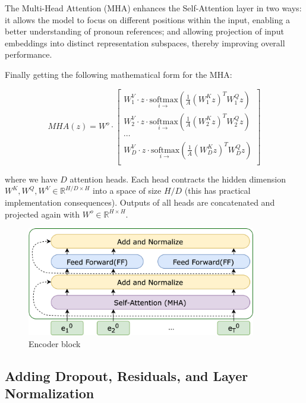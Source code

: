 The Multi-Head Attention ($\mathrm{MHA}$) enhances the Self-Attention layer in two ways: it allows the model to focus on different positions within the input, enabling a better understanding of pronoun references; and allowing projection of input embeddings into distinct representation subspaces, thereby improving overall performance.

\noindent Finally getting the following mathematical form for the $\mathrm{MHA}$:


\begin{equation}
MHA(z) =  W^o \cdot
\begin{bmatrix}
    W^V_1 \cdot z \cdot \underset{i \rightarrow}{\mathrm{softmax}}\left( \frac{1}{A} \left(W^K_1 z\right)^T W^Q_1 z \right)\\
    W^V_2 \cdot z \cdot \underset{i \rightarrow}{\mathrm{softmax}}\left( \frac{1}{A} \left(W^K_2 z\right)^T W^Q_2 z \right)\\
    \cdots\\
    W^V_D \cdot z \cdot \underset{i \rightarrow}{\mathrm{softmax}}\left( \frac{1}{A} \left(W^K_D z\right)^T W^Q_D z \right)\\
\end{bmatrix}\nonumber
\end{equation}

where we have $D$ attention heads. Each head contracts the hidden dimension $W^K, W^Q, W^V \in \mathbb{R}^{H / D \times H}$ into a space of size $H / D$ (this has practical implementation consequences). Outputs of all heads are concatenated and projected again with $W^o \in \mathbb{R}^{H \times H}$.

\begin{figure}[h]
    \centering
    \includegraphics[width=10cm]{pages/imgs/encoder_block.png}
    \caption{Encoder block}
    \label{fig:encoder_block}
\end{figure}




\subsection{Adding Dropout, Residuals, and Layer Normalization}

